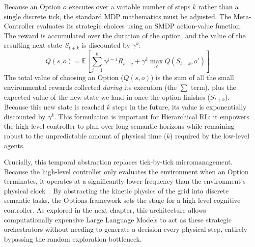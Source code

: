 Because an Option $o$ executes over a variable number of steps $k$ rather than a single discrete tick, the standard MDP mathematics must be adjusted. The Meta-Controller evaluates its strategic choices using an SMDP action-value function. The reward is accumulated over the duration of the option, and the value of the resulting next state $S_{t+k}$ is discounted by $\gamma^k$:
\begin{equation}
    Q(s, o) = \mathbb{E} \left[ \sum_{j=1}^{k} \gamma^{j-1} R_{t+j} + \gamma^k \max_{o'} Q(S_{t+k}, o') \right]
\label{eq:smdp_bellman}
\end{equation}
The total value of choosing an Option ($Q(s, o)$) is the sum of all the small environmental rewards collected \emph{during} its execution (the $\sum$ term), plus the expected value of the new state we land in once the option finishes ($S_{t+k}$). Because this new state is reached $k$ steps in the future, its value is exponentially discounted by $\gamma^k$. This formulation is important for Hierarchical RL: it empowers the high-level controller to plan over long semantic horizons while remaining robust to the unpredictable amount of physical time ($k$) required by the low-level agents.

Crucially, this temporal abstraction replaces tick-by-tick micromanagement. Because the high-level controller only evaluates the environment when an Option terminates, it operates at a significantly lower frequency than the environment's physical clock~\parencite{Sutton_Precup_Singh_1999}. By abstracting the kinetic physics of the grid into discrete semantic tasks, the Options framework sets the stage for a high-level cognitive controller. As explored in the next chapter, this architecture allows computationally expensive Large Language Models to act as these strategic orchestrators without needing to generate a decision every physical step, entirely bypassing the random exploration bottleneck.